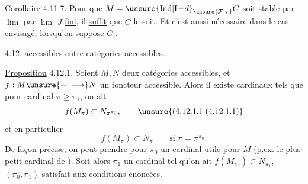 \uline{Corollaire} 4.11.7. Pour que $M=\unsure{\mathrm{Ind}|\mathrm I\!-\!d}_{\unsure{\mathcal F|\tau}} C$
soit stable par $\underrightarrow{\lim}$  par $\underleftarrow{\lim}$ $J$ \uline{fini},
il \uline{suffit} que $C$ le soit. Et c'est
aussi nécessaire dans le cas envisagé,
lorsqu'on suppose $C$ .

4.12. \uline{ accessibles entre catégories
accessibles}. 

\uline{Proposition} 4.12.1. Soient $M,N$ deux
catégories accessibles, et $f:M\unsure{-|\longrightarrow}N$
un foncteur accessible. Alors
il existe  cardinaux  tels que
 pour  cardinal $\pi\geq\pi_1$, 
on ait
\[
 f(M_\pi)\subset N_{\pi^{\pi_0}}, \tag*{\unsure{(4.12.1.1|(4.12.1.1)}}
\]
et en particulier
\[
 f(M_\pi)\subset N_\pi\qquad\text{si }\pi=\pi^{\pi_0}. \tag*{(4.12.1.2)}
\]
De façon  précise, on peut prendre
pour $\pi_0$ un cardinal  utile pour $M$
(p.ex. le plus petit cardinal 
de ). Soit alors $\pi_1$ un cardinal tel
qu'on ait $f(M_{\pi_0})\subset N_{\pi_1}$, 
 
 $(\pi_0,\pi_1)$ satisfait aux conditions énoncées.

